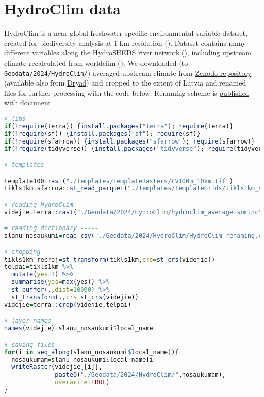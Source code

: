 \documentclass[
]{book}
\newcommand{\passthrough}[1]{#1}
\begin{document}
\section{HydroClim data}\label{Ch04.12}

HydroClim is a near-global freshwater-specific environmental variable dataset,
created for biodiversity analysis at 1 km resolution (). Dataset
contains many different variables along the HydroSHEDS river
network (), including upstream climate recalculated from
worldclim (). We downloaded (to \passthrough{\lstinline!Geodata/2024/HydroClim/!})
averaged upstream climate from \href{https://zenodo.org/records/5089529}{Zenodo repository}
(available also from \href{https://datadryad.org/dataset/doi:10.5061/dryad.dv920}{Dryad})
and cropped to the extent of Latvia and renamed files for further processing
with the code below. Renaming scheme is \href{https://github.com/aavotins/HiQBioDiv_EGVs/blob/main/Data/Geodata/2024/HydroClim/HydroClim_renaming.csv}{published with document}

\begin{lstlisting}[language=R]
# libs ----
if(!require(terra)) {install.packages("terra"); require(terra)}
if(!require(sf)) {install.packages("sf"); require(sf)}
if(!require(sfarrow)) {install.packages("sfarrow"); require(sfarrow)}
if(!require(tidyverse)) {install.packages("tidyverse"); require(tidyverse)}

# templates ----

template100=rast("./Templates/TemplateRasters/LV100m_10km.tif")
tikls1km=sfarrow::st_read_parquet("./Templates/TemplateGrids/tikls1km_sauzeme.parquet")

# reading HydroClim ----
videjie=terra::rast("./Geodata/2024/HydroClim/hydroclim_average+sum.nc")

# reading dictionary -----
slanu_nosaukumi=read_csv("./Geodata/2024/HydroClim/HydroClim_renaming.csv")

# cropping ---
tikls1km_reproj=st_transform(tikls1km,crs=st_crs(videjie))
telpai=tikls1km %>% 
  mutate(yes=1) %>% 
  summarise(yes=max(yes)) %>% 
  st_buffer(.,dist=10000) %>% 
  st_transform(.,crs=st_crs(videjie))
videjie=terra::crop(videjie,telpai)

# layer names ----
names(videjie)=slanu_nosaukumi$local_name

# saving files ----
for(i in seq_along(slanu_nosaukumi$local_name)){
  nosaukumam=slanu_nosaukumi$local_name[i]
  writeRaster(videjie[[i]],
              paste0("./Geodata/2024/HydroClim/",nosaukumam),
              overwrite=TRUE)
}
\end{lstlisting}
\end{document}
